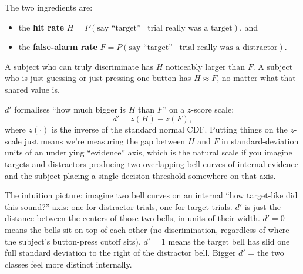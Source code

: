 \documentclass[11pt]{article}
\begin{document}
The two ingredients are:
\begin{itemize}
  \item the \textbf{hit rate} $H = P(\text{say ``target''} \mid \text{trial really was a target})$, and
  \item the \textbf{false-alarm rate} $F = P(\text{say ``target''} \mid \text{trial really was a distractor})$.
\end{itemize}
A subject who can truly discriminate has $H$ noticeably larger than $F$. A subject who is just guessing or just pressing one button has $H \approx F$, no matter what that shared value is.

$d'$ formalises ``how much bigger is $H$ than $F$'' on a $z$-score scale:
\[
d' = z(H) - z(F),
\]
where $z(\cdot)$ is the inverse of the standard normal CDF. Putting things on the $z$-scale just means we're measuring the gap between $H$ and $F$ in standard-deviation units of an underlying ``evidence'' axis, which is the natural scale if you imagine targets and distractors producing two overlapping bell curves of internal evidence and the subject placing a single decision threshold somewhere on that axis.

The intuition picture: imagine two bell curves on an internal ``how target-like did this sound?'' axis: one for distractor trials, one for target trials. $d'$ is just the distance between the centers of those two bells, in units of their width. $d' = 0$ means the bells sit on top of each other (no discrimination, regardless of where the subject's button-press cutoff sits). $d' = 1$ means the target bell has slid one full standard deviation to the right of the distractor bell. Bigger $d'$ = the two classes feel more distinct internally.

\begin{center}
\end{center}
\end{document}
